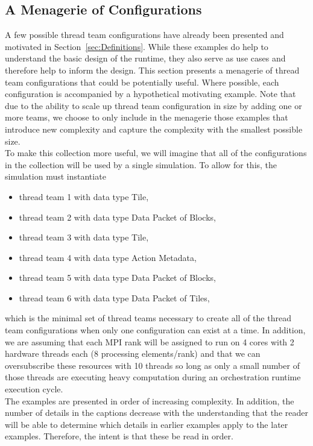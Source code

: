 \documentclass{article}
\begin{document}
\newpage
\begin{appendices}
\section{A Menagerie of Configurations}
\label{adx:ConfigMenagerie}

A few possible thread team configurations have already been presented and
motivated in Section~\ref{sec:Definitions}.  While these examples do help to
understand the basic design of the runtime, they also serve as use cases and
therefore help to inform the design.  This section presents a menagerie of
thread team configurations that could be potentially useful.  Where possible,
each configuration is accompanied by a hypothetical motivating example.  Note
that due to the ability to scale up thread team configuration in size by adding
one or more teams, we choose to only include in the menagerie those
examples that introduce new complexity and capture the complexity with the
smallest possible size.\\

To make this collection more useful, we will imagine that all of the
configurations in the collection will be used by a single simulation.  To allow
for this, the simulation must instantiate
\begin{itemize}
\item{thread team 1 with data type Tile,}
\item{thread team 2 with data type Data Packet of Blocks,}
\item{thread team 3 with data type Tile,}
\item{thread team 4 with data type Action Metadata,}
\item{thread team 5 with data type Data Packet of Blocks,}
\item{thread team 6 with data type Data Packet of Tiles,}
\end{itemize}
which is the minimal set of thread teams necessary to create all of the thread
team configurations when only one configuration can exist at a time.  In
addition, we are assuming that each MPI rank will be assigned to run on 4 cores
with 2 hardware threads each (8 processing elements/rank) and that we can
oversubscribe these resources with 10 threads so long as only a small number of
those threads are executing heavy computation during an orchestration runtime
execution cycle.\\

The examples are presented in order of increasing complexity.  In addition,
the number of details in the captions decrease with the understanding that the
reader will be able to determine which details in earlier examples apply to the
later examples.  Therefore, the intent is that these be read in order.


\end{appendices}
\end{document}
